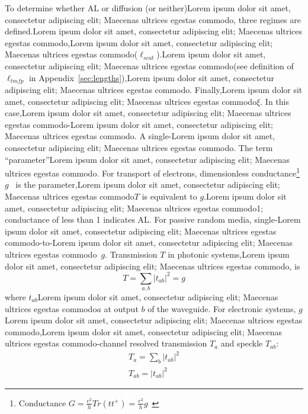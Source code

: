 To determine whether AL or diffusion (or neither)Lorem ipsum dolor sit amet, consectetur adipiscing elit; Maecenas ultrices egestas commodo, three regimes are defined.Lorem ipsum dolor sit amet, consectetur adipiscing elit; Maecenas ultrices egestas commodo,Lorem ipsum dolor sit amet, consectetur adipiscing elit; Maecenas ultrices egestas commodo($\ell_{scat}$).Lorem ipsum dolor sit amet, consectetur adipiscing elit; Maecenas ultrices egestas commodo(see definition of $\ell_{tmfp}$ in Appendix~\ref{sec:lengths}),Lorem ipsum dolor sit amet, consectetur adipiscing elit; Maecenas ultrices egestas commodo. Finally,Lorem ipsum dolor sit amet, consectetur adipiscing elit; Maecenas ultrices egestas commodo$\xi$. In this case,Lorem ipsum dolor sit amet, consectetur adipiscing elit; Maecenas ultrices egestas commodo-Lorem ipsum dolor sit amet, consectetur adipiscing elit; Maecenas ultrices egestas commodo. A single-Lorem ipsum dolor sit amet, consectetur adipiscing elit; Maecenas ultrices egestas commodo. The term ``parameter''Lorem ipsum dolor sit amet, consectetur adipiscing elit; Maecenas ultrices egestas commodo. For transport of electrons, dimensionless conductance\footnote{Conductance $G=\frac{e^2}{h}Tr(tt^+)=\frac{e^2}{h}g$~\cite{1988_Stone}} $g$~\cite{1979_Anderson} is the parameter,Lorem ipsum dolor sit amet, consectetur adipiscing elit; Maecenas ultrices egestas commodo$T$ is equivalent to $g$.Lorem ipsum dolor sit amet, consectetur adipiscing elit; Maecenas ultrices egestas commodo1; conductance of less than 1 indicates AL. For passive random media, single-Lorem ipsum dolor sit amet, consectetur adipiscing elit; Maecenas ultrices egestas commodo-to-Lorem ipsum dolor sit amet, consectetur adipiscing elit; Maecenas ultrices egestas commodo~$g$. Transmission $T$ in photonic systems,Lorem ipsum dolor sit amet, consectetur adipiscing elit; Maecenas ultrices egestas commodo\cite{1988_Stone,1981_Fisher,1981_Soukoulis}, is
\begin{equation}
 T = \sum_{a,b} |t_{ab}|^2 = g
\end{equation}
where $t_{ab}$Lorem ipsum dolor sit amet, consectetur adipiscing elit; Maecenas ultrices egestas commodo$a$ at output $b$ of the waveguide. For electronic systems, $g$Lorem ipsum dolor sit amet, consectetur adipiscing elit; Maecenas ultrices egestas commodo,Lorem ipsum dolor sit amet, consectetur adipiscing elit; Maecenas ultrices egestas commodo-channel resolved transmission $T_{a}$ and speckle $T_{ab}$: 
\begin{equation}
\begin{gathered}
 T_a = \sum_b |t_{ab}|^2 \\
 T_{ab} = |t_{ab}|^2
\end{gathered}
\end{equation}

